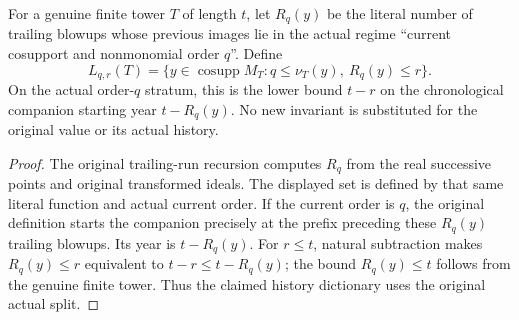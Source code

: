\begin{definition}
\label{hir:original-companion-history-year-threshold}
\leanok
For a genuine finite tower $T$ of length $t$, let $R_q(y)$ be the literal
number of trailing blowups whose previous images lie in the actual regime
``current cosupport and nonmonomial order $q$''. Define
\[
 L_{q,r}(T)=\{y\in\operatorname{cosupp}M_T:
                 q\le\nu_T(y),\ R_q(y)\le r\}.
\]
On the actual order-$q$ stratum, this is the lower bound $t-r$ on the
chronological companion starting year $t-R_q(y)$. No new invariant is
substituted for the original value or its actual history.
\end{definition}
\begin{proof}
The original trailing-run recursion computes $R_q$ from the real successive
points and original transformed ideals. The displayed set is defined by
that same literal function and actual current order. If the current order
is $q$, the original definition starts the companion precisely at the
prefix preceding these $R_q(y)$ trailing blowups. Its year is $t-R_q(y)$.
For $r\le t$, natural subtraction makes $R_q(y)\le r$ equivalent to
$t-r\le t-R_q(y)$; the bound $R_q(y)\le t$ follows from the genuine finite
tower. Thus the claimed history dictionary uses the original actual split.
\end{proof}

